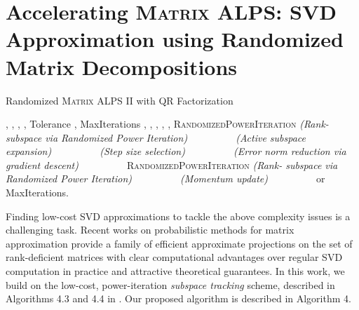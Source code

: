 \documentclass[twocolumn]{svjour3}
\begin{document}
\section{Accelerating \textsc{Matrix ALPS}: SVD Approximation using Randomized Matrix Decompositions }{\label{section:QR}}

\begin{algorithm*}[Htp!]
   \caption{Randomized \textsc{Matrix ALPS II} with QR Factorization}\label{algo: class}
\begin{algorithmic}[1]
    , , , , Tolerance , MaxIterations
    , , , , , 
    \State \hspace{0.16cm}  \textsc{RandomizedPowerIteration} \hspace*{\fill}\textit{(Rank- subspace via Randomized Power Iteration)~~~~~~~~~}
   \State \hspace{0.16cm}  \hspace*{\fill}\textit{(Active subspace expansion)~~~~~~~~~}
   \State \hspace{0.16cm}  \hspace*{\fill} \textit{(Step size selection)~~~~~~~~~}
   \State \hspace{0.16cm}  \hspace*{\fill} \textit{(Error norm reduction via gradient descent)~~~~~~~~~}
   \State \hspace{0.16cm}  \textsc{RandomizedPowerIteration}  \hspace*{\fill}\textit{(Rank- subspace via Randomized Power Iteration)~~~~~~~~~}
   \State \hspace{0.16cm}  
   \State \hspace{0.16cm}  \hspace*{\fill}\textit{(Momentum update)~~~~~~~~~}
   \State \hspace{0.16cm} 
   \Statex \hspace{0.16cm} 
     or MaxIterations.
\end{algorithmic}
\end{algorithm*} 

Finding low-cost SVD approximations to tackle the above complexity issues is a challenging task. Recent works on probabilistic methods for matrix approximation \cite{findingstructure} provide a family of efficient approximate projections on the set of rank-deficient matrices with clear computational advantages over regular SVD computation in practice and attractive theoretical guarantees. In this work, we build on the low-cost, power-iteration {\it subspace tracking} scheme, described in Algorithms 4.3 and 4.4 in \cite{findingstructure}. Our proposed algorithm is described in Algorithm 4.
\end{document}
